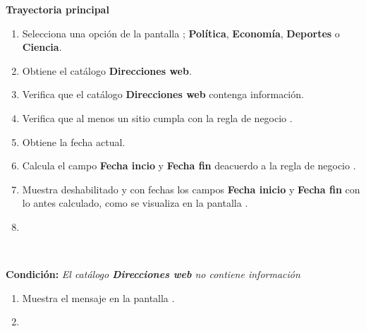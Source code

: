

\begin{large}
	\textbf{Trayectoria principal}\\
\end{large}	

\begin{enumerate}[1.]
	
	\item \actor Selecciona una opción de la pantalla ; \textbf{Política}, \textbf{Economía}, \textbf{Deportes} o \textbf{Ciencia}. 
	
	\item \sistema Obtiene el catálogo \textbf{Direcciones web}.
	
	\item \sistema Verifica que el catálogo \textbf{Direcciones web} contenga información. 
	
	\item \sistema Verifica que al menos un sitio cumpla con la regla de negocio . 

	\item \sistema Obtiene la fecha actual.

	\item \sistema \label{CU1:FechaI}Calcula el campo \textbf{Fecha incio} y \textbf{Fecha fin} deacuerdo a la regla de negocio .

	\item \label{CU1:Pantalla}\sistema Muestra deshabilitado y con fechas los campos \textbf{Fecha inicio} y \textbf{Fecha fin} con lo antes calculado, como se visualiza en la pantalla .
	
	\item \finCU	

\end{enumerate}



\begin{large}
	\\
\end{large}	
\textbf{Condición:} \textit{El catálogo \textbf{Direcciones web} no contiene información}

\begin{enumerate}[{A-}1.]

	\item \sistema Muestra el mensaje  en la pantalla .
	\item \finCU	

\end{enumerate}

